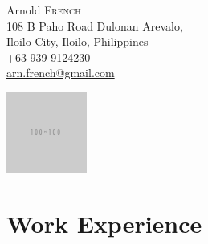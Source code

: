 \documentclass[a4paper,10pt]{article}
\begin{document}
\pagestyle{empty}


\begin{minipage}{0.6\textwidth}
  \raggedright \Huge Arnold \textsc{French}\\ \vspace{1ex}
  \normalsize 108 B Paho Road Dulonan Arevalo,\\ Iloilo City, Iloilo, Philippines\\
  +63 939 9124230\\
  \href{mailto:arn.french@gmail.com}{arn.french@gmail.com}
\end{minipage}
\hfill
\begin{minipage}{0.3\textwidth}
  \includegraphics[scale=0.75,right]{image.png}
\end{minipage}


\section{Work Experience}
\end{document}
